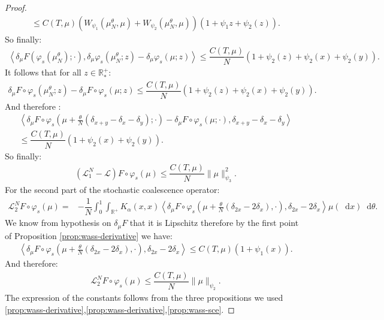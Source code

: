 \documentclass[11pt,a4paper]{article}
\newcommand{\RR}{\mathbb{R}}
\newcommand{\RRP}{\mathbb{R}^+_*}
\newcommand{\LC}{\mathcal{L}}
\newcommand{\brac}[1]{\left\langle#1\right\rangle}
\newcommand{\dd}{\mathop{}\!\mathrm{d}}
\begin{document}
\begin{proof}
\begin{multline*}
         \leq C(T,\mu) \left(W_{\psi_1}\left(\mu^\theta_N, \mu\right) + W_{\psi_2}\left(\mu^\theta_N, \mu\right) \right)(1 + \psi_1{z} + \psi_2(z)).
    \end{multline*}
    So finally:
    \begin{align*}
        \brac{\delta_\mu F\left(\varphi_s\left(\mu^\theta_N\right);\cdot\right),\delta_\mu \varphi_s \left(\mu^\theta_N;z\right) - \delta_\mu \varphi_s (\mu;z)} \leq \dfrac{C(T,\mu)}{N}(1 + \psi_2(z) + \psi_2(x) + \psi_2(y)).
    \end{align*}
    It follows that for all $z \in \RRP$:
    \begin{align*}
        \delta_\mu F\circ \varphi_s\left(\mu^\theta_N;z\right) - \delta_\mu F\circ \varphi_s(\mu;z) \leq \dfrac{C(T,\mu)}{N}(1 + \psi_2(z) + \psi_2(x) + \psi_2(y)).
    \end{align*}
    And therefore :
    \begin{multline*}
        \left\langle  \delta_\mu F\circ \varphi_s\left(\mu + \frac{\theta}{N}\left(\delta_{x + y} - \delta_x - \delta_y \right);\cdot\right)- \delta_\mu F\circ \varphi_s\left(\mu;\cdot\right),\delta_{x+y} - \delta_x - \delta_y\right\rangle \\
        \leq \dfrac{C(T,\mu)}{N}(1 + \psi_2(x) + \psi_2(y)).
    \end{multline*}
    So finally:
    \begin{align*}
        \left(\LC_1^N - \LC\right)F\circ \varphi_s (\mu) \leq \dfrac{C(T,\mu)}{N} \|\mu\|_{\psi_3}^2.
    \end{align*}
    For the second part of the stochastic coalescence operator:
    \begin{align*}
        \LC_2^N F\circ \varphi_s(\mu) =& -\dfrac{1}{N}\int_0^1\int_{\RR^+} K_{\alpha}(x,x) 
           \left\langle  \delta_\mu F\circ \varphi_s\left(\mu + \frac{\theta}{N}\left(\delta_{2x} - 2\delta_x \right),\cdot\right),\delta_{2x} - 2\delta_x \right\rangle\mu(\dd x)\dd\theta.
    \end{align*}
    We know from hypothesis on $\delta_\mu F$ that it is Lipschitz therefore by the first point of Proposition \ref{prop:wass-derivative} we have:
    \begin{align*}
        \left\langle  \delta_\mu F\circ \varphi_s\left(\mu + \frac{\theta}{N}\left(\delta_{2x} - 2\delta_x \right),\cdot\right),\delta_{2x} - 2\delta_x \right\rangle \leq C(T,\mu) (1 + \psi_1(x)).
    \end{align*}
    And therefore:
    \begin{align*}
         \LC_2^N F\circ \varphi_s(\mu) \leq \dfrac{C(T,\mu)}{N} \|\mu\|_{\psi_2}.
    \end{align*}
    The expression of the constants follows from the three propositions we used \ref{prop:wass-derivative},\ref{prop:wass-derivative},\ref{prop:wass-sce}.
\end{proof}
\end{document}
